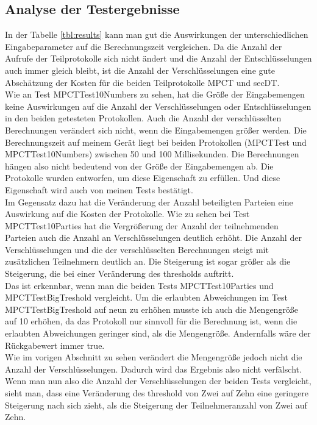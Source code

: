 \subsection{Analyse der Testergebnisse}
In der Tabelle \ref{tbl:results} kann man gut die Auswirkungen der unterschiedlichen Eingabeparameter auf die Berechnungszeit vergleichen. Da die Anzahl der Aufrufe der Teilprotokolle sich nicht ändert und die Anzahl der Entschlüsselungen auch immer gleich bleibt, ist die Anzahl der Verschlüsselungen eine gute Abschätzung der Kosten für die beiden Teilprotokolle MPCT und secDT.\\
Wie an Test MPCTTest10Numbers zu sehen, hat die Größe der Eingabemengen keine Auswirkungen auf die Anzahl der Verschlüsselungen oder Entschlüsselungen in den beiden getesteten Protokollen. Auch die Anzahl der verschlüsselten Berechnungen verändert sich nicht, wenn die Eingabemengen größer werden. Die Berechnungszeit auf meinem Gerät liegt bei beiden Protokollen (MPCTTest und MPCTTest10Numbers) zwischen 50 und 100 Millisekunden. Die Berechnungen hängen also nicht bedeutend von der Größe der Eingabemengen ab. Die Protokolle wurden entworfen, um diese Eigenschaft zu erfüllen. \cite{Doettling2021} Und diese Eigenschaft wird auch von meinen Tests bestätigt.\\
Im Gegensatz dazu hat die Veränderung der Anzahl beteiligten Parteien eine Auswirkung auf die Kosten der Protokolle. Wie zu sehen bei Test MPCTTest10Parties hat die Vergrößerung der Anzahl der teilnehmenden Parteien auch die Anzahl an Verschlüsselungen deutlich erhöht. Die Anzahl der Verschlüsselungen und die der verschlüsselten Berechnungen steigt mit zusätzlichen Teilnehmern deutlich an. Die Steigerung ist sogar größer als die Steigerung, die bei einer Veränderung des thresholds auftritt.\\
Das ist erkennbar, wenn man die beiden Tests MPCTTest10Parties und MPCTTestBigTreshold vergleicht. Um die erlaubten Abweichungen im Test MPCTTestBigTreshold auf neun zu erhöhen musste ich auch die Mengengröße auf 10 erhöhen, da das Protokoll nur sinnvoll für die Berechnung ist, wenn die erlaubten Abweichungen geringer sind, als die Mengengröße. Andernfalls wäre der Rückgabewert immer true.\\
Wie im vorigen Abschnitt zu sehen verändert die Mengengröße jedoch nicht die Anzahl der Verschlüsselungen. Dadurch wird das Ergebnis also nicht verfälscht.
Wenn man nun also die Anzahl der Verschlüsselungen der beiden Tests vergleicht, sieht man, dass eine Veränderung des threshold von Zwei auf Zehn eine geringere Steigerung nach sich zieht, als die Steigerung der Teilnehmeranzahl von Zwei auf Zehn.\\
